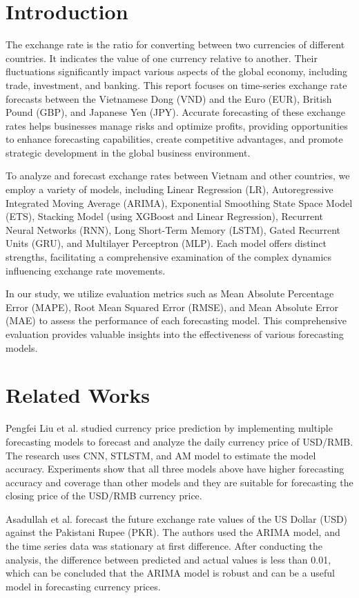 \documentclass{ieeeojies}
\begin{document}
\section{Introduction}
\label{sec:introduction}
\justify
The exchange rate is the ratio for converting between two currencies of different countries. It indicates the value of one currency relative to another. Their fluctuations significantly impact various aspects of the global economy, including trade, investment, and banking. This report focuses on time-series exchange rate forecasts between the Vietnamese Dong (VND) and the Euro (EUR), British Pound (GBP), and Japanese Yen (JPY). Accurate forecasting of these exchange rates helps businesses manage risks and optimize profits, providing opportunities to enhance forecasting capabilities, create competitive advantages, and promote strategic development in the global business environment.

To analyze and forecast exchange rates between Vietnam and other countries, we employ a variety of models, including Linear Regression (LR), Autoregressive Integrated Moving Average (ARIMA), Exponential Smoothing State Space Model (ETS), Stacking Model (using XGBoost and Linear Regression), Recurrent Neural Networks (RNN), Long Short-Term Memory (LSTM), Gated Recurrent Units (GRU), and Multilayer Perceptron (MLP). Each model offers distinct strengths, facilitating a comprehensive examination of the complex dynamics influencing exchange rate movements.

In our study, we utilize evaluation metrics such as Mean Absolute Percentage Error (MAPE), Root Mean Squared Error (RMSE), and Mean Absolute Error (MAE) to assess the performance of each forecasting model. This comprehensive evaluation provides valuable insights into the effectiveness of various forecasting models.

\section{Related Works}
\justify
Pengfei Liu et al. \cite{rw1} studied currency price prediction by implementing multiple forecasting models to forecast and analyze the daily currency price of USD/RMB. The research uses CNN, STLSTM, and AM model to estimate the model accuracy. Experiments show that all three models above have higher forecasting accuracy and coverage than other models and they are suitable for forecasting the closing price of the USD/RMB currency price.

Asadullah et al. \cite{rw2} forecast the future exchange rate values of the US Dollar (USD) against the Pakistani Rupee (PKR). The authors used the ARIMA model, and the time series data was stationary at first difference. After conducting the analysis, the difference between predicted and actual values is less than 0.01, which can be concluded that the ARIMA model is robust and can be a useful model in forecasting currency prices.
\end{document}
